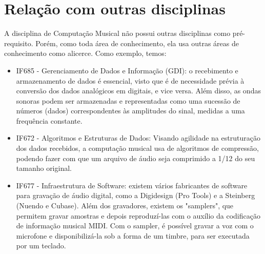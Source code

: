 \documentclass[10pt]{article}
\begin{document}
\section {Relação com outras disciplinas}
\hspace {0,5in} A disciplina de Computação Musical não possui outras disciplinas como pré-requisito. Porém, como toda área de conhecimento, ela usa outras áreas de conhecimento como alicerce. Como exemplo, temos:\begin{itemize}
    \item IF685 - Gerenciamento de Dados e Informação (GDI): o recebimento e armazenamento de dados é essencial, visto que é de necessidade prévia à conversão dos dados analógicos em digitais, e vice versa. Além disso, as ondas sonoras podem ser armazenadas e representadas como uma sucessão de números (dados) correspondentes às amplitudes do sinal, medidas a uma frequência constante.
    \item IF672 - Algoritmos e Estruturas de Dados: Visando agilidade na estruturação dos dados recebidos, a computação musical usa de algoritmos de compressão, podendo fazer com que um arquivo de áudio seja comprimido a 1/12 \hspace{0.01in}\cite{intromusical} do seu tamanho original.
    \item IF677 - Infraestrutura de Software: existem vários fabricantes de software para gravação de áudio digital, como a Digidesign (Pro Tools) e a Steinberg (Nuendo e Cubase). Além dos gravadores, existem os "samplers", que permitem gravar amostras e depois reproduzí-las com o auxílio da codificação de informação musical MIDI. Com o sampler, é possível gravar a voz com o microfone e disponibilizá-la sob a forma de um timbre, para ser executada por um teclado.
\end{itemize}


\end{document}
